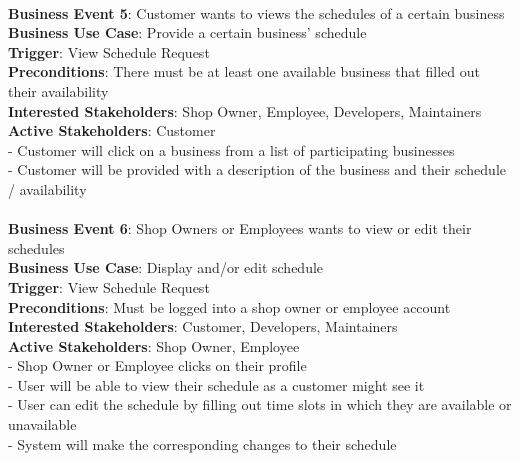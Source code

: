 \documentclass[12pt]{article}
\begin{document}
\\ \textbf{Business Event 5}: Customer wants to views the schedules of a certain business
\\ \textbf{Business Use Case}: Provide a certain business' schedule
\\ \textbf{Trigger}: View Schedule Request
\\ \textbf{Preconditions}: There must be at least one available business that filled out their availability
\\ \textbf{Interested Stakeholders}: Shop Owner, Employee, Developers, Maintainers
\\ \textbf{Active Stakeholders}: Customer
\\ - Customer will click on a business from a list of participating businesses
\\ - Customer will be provided with a description of the business and their schedule / availability
\\

\\ \textbf{Business Event 6}: Shop Owners or Employees wants to view or edit their schedules
\\ \textbf{Business Use Case}: Display and/or edit schedule
\\ \textbf{Trigger}: View Schedule Request
\\ \textbf{Preconditions}: Must be logged into a shop owner or employee account
\\ \textbf{Interested Stakeholders}: Customer, Developers, Maintainers
\\ \textbf{Active Stakeholders}: Shop Owner, Employee
\\ - Shop Owner or Employee clicks on their profile
\\ - User will be able to view their schedule as a customer might see it
\\ - User can edit the schedule by filling out time slots in which they are available or unavailable
\\ - System will make the corresponding changes to their schedule
\\
\end{document}
